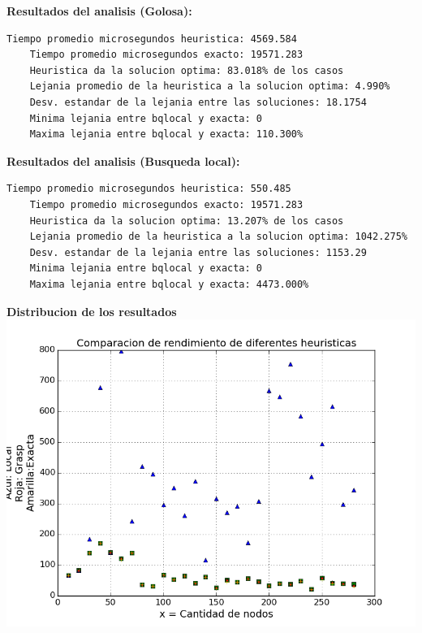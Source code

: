 \vspace{1cm}

\textbf{Resultados del analisis (Golosa):}
\begin{lstlisting}[frame=single]	
	Tiempo promedio microsegundos heuristica: 4569.584
	Tiempo promedio microsegundos exacto: 19571.283
	Heuristica da la solucion optima: 83.018% de los casos
	Lejania promedio de la heuristica a la solucion optima: 4.990%
	Desv. estandar de la lejania entre las soluciones: 18.1754
	Minima lejania entre bqlocal y exacta: 0
	Maxima lejania entre bqlocal y exacta: 110.300%
\end{lstlisting}

\textbf{Resultados del analisis (Busqueda local):}
\begin{lstlisting}[frame=single]	
	Tiempo promedio microsegundos heuristica: 550.485
	Tiempo promedio microsegundos exacto: 19571.283
	Heuristica da la solucion optima: 13.207% de los casos
	Lejania promedio de la heuristica a la solucion optima: 1042.275%
	Desv. estandar de la lejania entre las soluciones: 1153.29
	Minima lejania entre bqlocal y exacta: 0
	Maxima lejania entre bqlocal y exacta: 4473.000%
\end{lstlisting}

\vspace{2cm}

\begin{center}	
	\textbf{Distribucion de los resultados}\\
	\includegraphics[scale=0.7]{experimentos/performance-optimalidad-cliques_beta_n_over_128/comparacion_optimalidad.png}
\end{center}


